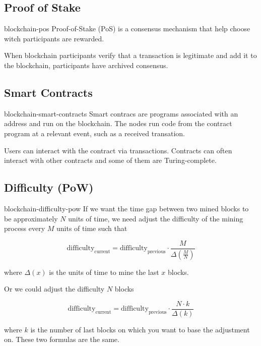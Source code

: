 \documentclass[preview]{standalone}
\begin{document}
\subsection{Proof of Stake}

\begin{snippet}{blockchain-pos}
Proof-of-Stake (PoS) is a consensus mechanism that help choose witch participants
are rewarded.

When blockchain participants verify that a transaction is legitimate and add it
to the blockchain, participants have archived consensus.
\end{snippet}

\subsection{Smart Contracts}

\begin{snippet}{blockchain-smart-contracts}
Smart contracs are programs associated with an address and run on the blockchain.
The nodes run code from the contract program at a relevant event, such as a received transation.

Users can interact with the contract via transactions. Contracts can often interact with other contracts
and some of them are Turing-complete.
\end{snippet}

%
%

\subsection{Difficulty (PoW)}

\begin{snippet}{blockchain-difficulty-pow}
If we want the time gap between two mined blocks to be approximately
\(N\) units of time, we need adjust the difficulty of the mining process every 
\(M\) units of time such that

\[
    \text{difficulty}_\text{current} =
    \text{difficulty}_\text{previous}
    \cdot \frac{M}{\Delta (\frac{M}{N})}
\]

where \(\Delta (x)\) is the units of time to mine the last \(x\) blocks.

Or we could adjust the difficulty \(N\) blocks

\[
    \text{difficulty}_\text{current} =
    \text{difficulty}_\text{previous}
    \cdot \frac{N \cdot k}{\Delta(k)}
\]

where \(k\) is the number of last blocks on which you want to
base the adjustment on. These two formulas are the same.
\end{snippet}
\end{document}
